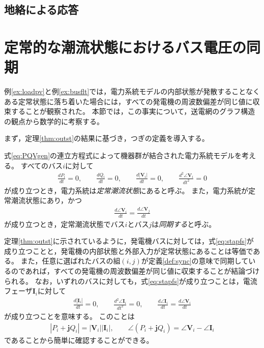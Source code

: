 \documentclass[tombow,dvipdfmx]{corona-a5-1.1}
\begin{document}
\subsection{地絡による応答}

\begin{例}[バス地絡が発生したときの電力系統モデルの時間応答]\label{ex:busflt}
\end{例}




\section{定常的な潮流状態におけるバス電圧の同期\advanced}\label{sec:phsync}

例\ref{ex:loadpv}と例\ref{ex:busflt}では，電力系統モデルの内部状態が発散することなくある定常状態に落ち着いた場合には，すべての発電機の周波数偏差が同じ値に収束することが観察された。
本節では，この事実について，送電網のグラフ構造の観点から数学的に考察する。

まず，定理\ref{thm:outst}の結果に基づき，つぎの定義を導入する。

\begin{定義}[定常潮流状態とバス電圧の同期]
\label{def:sync}
式\ref{eq:PQVgen}の連立方程式によって機器群が結合された電力系統モデルを考える。
すべてのバス$i$に対して
\begin{align}\label{eq:stapfs}
\frac{dP_i}{dt}=0
,\qquad
\frac{dQ_i}{dt}=0
,\qquad
\frac{d|\bm{V}_i|}{dt}=0
,\qquad
\frac{d^2 \angle \bm{V}_i }{dt^2}=0
\end{align}
が成り立つとき，電力系統は\emph{定常潮流状態}にあると呼ぶ。
また，電力系統が定常潮流状態にあり，かつ
\begin{align}\label{eq:defsyn}
\frac{d \angle \bm{V}_i}{dt} =  \frac{d \angle \bm{V}_j}{dt}
\end{align}
が成り立つとき，定常潮流状態でバス$i$とバス$j$は\emph{同期する}と呼ぶ。
\end{定義}

定理\ref{thm:outst}に示されているように，発電機バスに対しては，式\ref{eq:stapfs}が成り立つことと，発電機の内部状態と外部入力が定常状態にあることは等価である。
また，任意に選ばれたバスの組$(i,j)$が定義\ref{def:sync}の意味で同期しているのであれば，すべての発電機の周波数偏差が同じ値に収束することが結論づけられる。
なお，いずれのバスに対しても，式\ref{eq:stapfs}が成り立つことは，電流フェーザ$\bm{I}_i$に対して
\begin{align*}
\frac{d|\bm{I}_i|}{dt}=0
,\qquad
\frac{d^2 \angle \bm{I}_i }{dt^2}=0
,\qquad
\frac{d \angle \bm{I}_i }{dt} = \frac{d \angle \bm{V}_i }{dt} 
\end{align*}
が成り立つことを意味する。
このことは
\begin{align*}
|P_i + \bm{j} Q_i| = |\bm{V}_i| |\bm{I}_i|
,\qquad
\angle(P_i + \bm{j} Q_i) = \angle \bm{V}_i - \angle \bm{I}_i
\end{align*}
であることから簡単に確認することができる。
\end{document}
